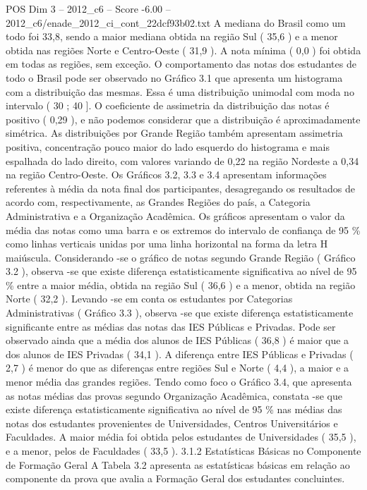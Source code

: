\begin{textsample}{POS Dim 3 – 2012\_c6 – Score -6.00 – 2012\_c6/enade\_2012\_ci\_cont\_22dcf93b02.txt}
A mediana do Brasil como um todo foi 33,8, sendo a maior mediana obtida na região Sul ( 35,6 ) e a menor obtida nas regiões Norte e Centro-Oeste ( 31,9 ).
A nota mínima ( 0,0 ) foi obtida em todas as regiões, sem exceção.
O comportamento das notas dos estudantes de todo o Brasil pode ser observado no Gráfico 3.1 que apresenta um histograma com a distribuição das mesmas.
Essa é uma distribuição unimodal com moda no intervalo ( 30 ; 40 ].
O coeficiente de assimetria da distribuição das notas é positivo ( 0,29 ), e não podemos considerar que a distribuição é aproximadamente simétrica.
As distribuições por Grande Região também apresentam assimetria positiva, concentração pouco maior do lado esquerdo do histograma e mais espalhada do lado direito, com valores variando de 0,22 na região Nordeste a 0,34 na região Centro-Oeste.
Os Gráficos 3.2, 3.3 e 3.4 apresentam informações referentes à média da nota final dos participantes, desagregando os resultados de acordo com, respectivamente, as Grandes Regiões do país, a Categoria Administrativa e a Organização Acadêmica.
Os gráficos apresentam o valor da média das notas como uma barra e os extremos do intervalo de confiança de 95 \% como linhas verticais unidas por uma linha horizontal na forma da letra H maiúscula.
Considerando -se o gráfico de notas segundo Grande Região ( Gráfico 3.2 ), observa -se que existe diferença estatisticamente significativa ao nível de 95 \% entre a maior média, obtida na região Sul ( 36,6 ) e a menor, obtida na região Norte ( 32,2 ).
Levando -se em conta os estudantes por Categorias Administrativas ( Gráfico 3.3 ), observa -se que existe diferença estatisticamente significante entre as médias das notas das IES Públicas e Privadas.
Pode ser observado ainda que a média dos alunos de IES Públicas ( 36,8 ) é maior que a dos alunos de IES Privadas ( 34,1 ).
A diferença entre IES Públicas e Privadas ( 2,7 ) é menor do que as diferenças entre regiões Sul e Norte ( 4,4 ), a maior e a menor média das grandes regiões.
Tendo como foco o Gráfico 3.4, que apresenta as notas médias das provas segundo Organização Acadêmica, constata -se que existe diferença estatisticamente significativa ao nível de 95 \% nas médias das notas dos estudantes provenientes de Universidades, Centros Universitários e Faculdades.
A maior média foi obtida pelos estudantes de Universidades ( 35,5 ), e a menor, pelos de Faculdades ( 33,5 ). 3.1.2 Estatísticas Básicas no Componente de Formação Geral A Tabela 3.2 apresenta as estatísticas básicas em relação ao componente da prova que avalia a Formação Geral dos estudantes concluintes.

\end{textsample}
